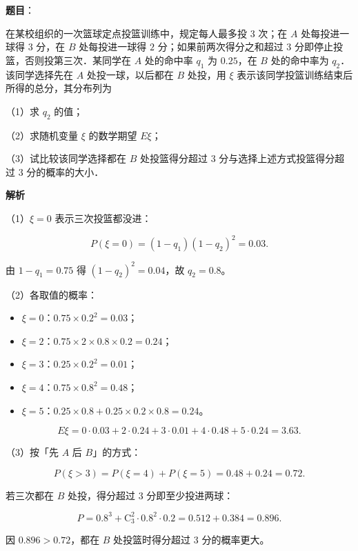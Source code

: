 \begin{answer}

\textbf{题目}：

在某校组织的一次篮球定点投篮训练中，规定每人最多投 $3$ 次；在 $A$ 处每投进一球得 $3$ 分，在 $B$ 处每投进一球得 $2$ 分；如果前两次得分之和超过 $3$ 分即停止投篮，否则投第三次．某同学在 $A$ 处的命中率 $q_1$ 为 $0.25$，在 $B$ 处的命中率为 $q_2$．该同学选择先在 $A$ 处投一球，以后都在 $B$ 处投，用 $\xi$ 表示该同学投篮训练结束后所得的总分，其分布列为
\nopagebreak[4]
\begin{center}\end{center}
\nopagebreak[4]
（1）求 $q_2$ 的值；

（2）求随机变量 $\xi$ 的数学期望 $E\xi$；

（3）试比较该同学选择都在 $B$ 处投篮得分超过 $3$ 分与选择上述方式投篮得分超过 $3$ 分的概率的大小．

\textbf{解析}

（1）$\xi=0$ 表示三次投篮都没进：

\nopagebreak[4]
\[P(\xi=0)=(1-q_1)(1-q_2)^2=0.03 .\]

由 $1-q_1=0.75$ 得 $(1-q_2)^2=0.04$，故 $q_2=0.8$。

（2）各取值的概率：

\begin{itemize}
\item $\xi=0$：$0.75\times0.2^2=0.03$；
\item $\xi=2$：$0.75\times2\times0.8\times0.2=0.24$；
\item $\xi=3$：$0.25\times0.2^2=0.01$；
\item $\xi=4$：$0.75\times0.8^2=0.48$；
\item $\xi=5$：$0.25\times0.8+0.25\times0.2\times0.8=0.24$。
\end{itemize}

\nopagebreak[4]
\[E\xi=0\cdot0.03+2\cdot0.24+3\cdot0.01+4\cdot0.48+5\cdot0.24=3.63 .\]

（3）按「先 $A$ 后 $B$」的方式：

\nopagebreak[4]
\[P(\xi>3)=P(\xi=4)+P(\xi=5)=0.48+0.24=0.72 .\]

若三次都在 $B$ 处投，得分超过 $3$ 分即至少投进两球：

\nopagebreak[4]
\[P=0.8^3+\mathrm C_3^2\cdot0.8^2\cdot0.2=0.512+0.384=0.896 .\]

因 $0.896>0.72$，都在 $B$ 处投篮时得分超过 $3$ 分的概率更大。


\end{answer}
